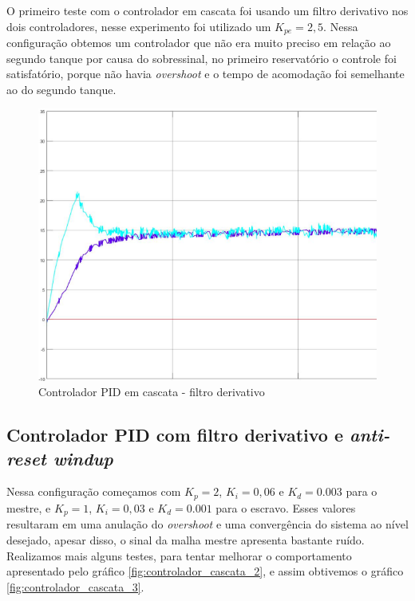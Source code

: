 \documentclass[
	12pt,				%
	openany,			%
	oneside,			%
	a4paper,			%
	english,			%
	french,				%
	spanish,			%
	brazil,				%
	]{abntex2}
\begin{document}
{O primeiro teste com o controlador em cascata foi usando um filtro derivativo nos dois controladores, nesse experimento foi utilizado um $K_{pe} = 2,5$. Nessa configuração obtemos um controlador que não era muito preciso em relação ao segundo tanque por causa do sobressinal, no primeiro reservatório o controle foi satisfatório, porque não havia \textit{overshoot} e o tempo de acomodação foi semelhante ao do segundo tanque.

\begin{figure}[h]
	\centering
	\includegraphics[scale=0.50]{13_cascata_1.png}
	\caption{Controlador PID em cascata - filtro derivativo}
\end{figure}

\subsection{Controlador PID com filtro derivativo e \textit{anti-reset windup}}

Nessa configuração começamos com $K_p = 2$, $K_i = 0,06$ e $K_d = 0.003$ para o mestre, e  $K_p = 1$, $K_i = 0,03$ e $K_d = 0.001$ para o escravo. Esses valores resultaram em uma anulação do \textit{overshoot} e uma convergência do sistema ao nível desejado, apesar disso, o sinal da malha mestre apresenta bastante ruído. Realizamos mais alguns testes, para tentar melhorar o comportamento apresentado pelo gráfico \ref{fig:controlador_cascata_2}, e assim obtivemos o gráfico \ref{fig:controlador_cascata_3}.

}
\end{document}
